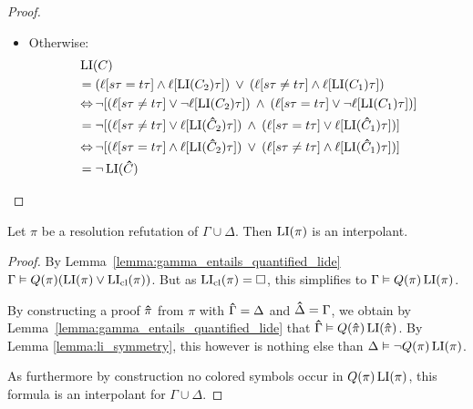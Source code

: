 \documentclass[,%
	draft=false,%
	numbers=noendperiod
	11pt,
	a4paper,
	oneside,%
	openany,
]{memoir}
\begin{document}
\begin{proof}
\begin{itemize}
\begin{itemize}
				\item Otherwise:
					\begin{align*}
						&\operatorname{LI}(C) \\
						 &= (\ell[s\tau=t\tau] \land \ell[\operatorname{LI}(C_2)\tau] ) \;\,{\lor}\;\, (\ell[s\tau\neq t\tau] \land \ell[\operatorname{LI}(C_1)\tau]) \\
						 &\operatorname{\Leftrightarrow} \lnot [ (\ell[s\tau\neq t\tau] \lor \lnot \ell[\operatorname{LI}(C_2)\tau] ) \;\,{\land}\;\, (\ell[s\tau= t\tau] \lor \lnot \ell[\operatorname{LI}(C_1)\tau]) ] \\
						 &= \lnot [ (\ell[s\tau\neq t\tau] \lor \ell[\operatorname{LI}(\bm\hat C_2)\tau] ) \;\,{\land}\;\, (\ell[s\tau= t\tau] \lor \ell[\operatorname{LI}(\bm\hat C_1)\tau]) ] \\
						 &\operatorname{\Leftrightarrow} \lnot [ (\ell[s\tau= t\tau] \land \ell[\operatorname{LI}(\bm\hat C_2)\tau] ) \;\,{\lor}\;\, (\ell[s\tau\neq t\tau] \land \ell[\operatorname{LI}(\bm\hat C_1)\tau]) ] \\
						&= \lnot \operatorname{LI}(\bm\hat C)
					\qedhere
					\end{align*}



			\end{itemize}


			\qedhere

	\end{itemize}
\end{proof}

\begin{thm}
	Let $\pi$ be a resolution refutation of $\Gamma\cup\Delta$.
	Then $\operatorname{LI}( \pi )$ is an interpolant.
\end{thm}
\begin{proof}
	By Lemma~\ref{lemma:gamma_entails_quantified_lide}
	$\Gamma \vDash Q(\pi)(\operatorname{LI}(\pi) \lor \operatorname{LI}_{\operatorname{cl}}(\pi))$.
	But as $\operatorname{LI}_{\operatorname{cl}}(\pi) = \square$, this simplifies to
	$\Gamma \vDash Q(\pi)\operatorname{LI}(\pi)$.

	By constructing a proof $\bm\hat \pi$ from $\pi$ with $\bm\hat \Gamma = \Delta$ and $\bm\hat \Delta = \Gamma$, we obtain by Lemma~\ref{lemma:gamma_entails_quantified_lide} that $\bm\hat\Gamma \vDash Q(\bm\hat \pi)\operatorname{LI}(\bm\hat \pi)$.
	By Lemma \ref{lemma:li_symmetry}, this however is nothing else than
	$\Delta \vDash \lnot Q(\pi) \operatorname{LI}(\pi)$. 

	As furthermore by construction no colored symbols occur in $Q(\pi) \operatorname{LI}(\pi)$, this formula is an interpolant for $\Gamma\cup\Delta$.
\end{proof}
\end{document}
